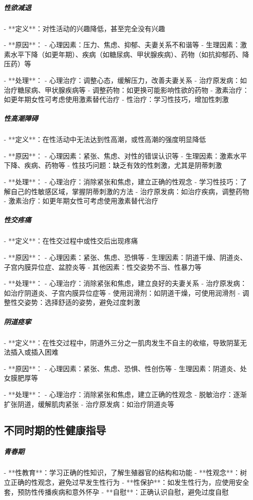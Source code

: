 \begin{enumerate}
\subparagraph{性欲减退}

- **定义**：对性活动的兴趣降低，甚至完全没有兴趣

- **原因**：
  - 心理因素：压力、焦虑、抑郁、夫妻关系不和谐等
  - 生理因素：激素水平下降（如更年期）、疾病（如糖尿病、甲状腺疾病）、药物（如抗抑郁药、降压药）等

- **处理**：
  - 心理治疗：调整心态，缓解压力，改善夫妻关系
  - 治疗原发病：如治疗糖尿病、甲状腺疾病等
  - 调整药物：如更换可能影响性欲的药物
  - 激素治疗：如更年期女性可考虑使用激素替代治疗
  - 性治疗：学习性技巧，增加性刺激

\subparagraph{性高潮障碍}

- **定义**：在性活动中无法达到性高潮，或性高潮的强度明显降低

- **原因**：
  - 心理因素：紧张、焦虑、对性的错误认识等
  - 生理因素：激素水平下降、疾病、药物等
  - 性技巧问题：缺乏有效的性刺激，尤其是阴蒂刺激

- **处理**：
  - 心理治疗：消除紧张和焦虑，建立正确的性观念
  - 学习性技巧：了解自己的性敏感区域，掌握阴蒂刺激的方法
  - 治疗原发病：如治疗疾病，调整药物
  - 激素治疗：如更年期女性可考虑使用激素替代治疗

\subparagraph{性交疼痛}

- **定义**：在性交过程中或性交后出现疼痛

- **原因**：
  - 心理因素：紧张、焦虑、恐惧等
  - 生理因素：阴道干燥、阴道炎、子宫内膜异位症、盆腔炎等
  - 其他因素：性交姿势不当、性暴力等

- **处理**：
  - 心理治疗：消除紧张和焦虑，建立良好的夫妻关系
  - 治疗原发病：如治疗阴道炎、子宫内膜异位症等
  - 使用润滑剂：如阴道干燥，可使用润滑剂
  - 调整性交姿势：选择舒适的姿势，避免过度刺激

\subparagraph{阴道痉挛}

- **定义**：在性交过程中，阴道外三分之一肌肉发生不自主的收缩，导致阴茎无法插入或插入困难

- **原因**：
  - 心理因素：紧张、焦虑、恐惧、性创伤等
  - 生理因素：阴道炎、处女膜肥厚等

- **处理**：
  - 心理治疗：消除紧张和焦虑，建立正确的性观念
  - 脱敏治疗：逐渐扩张阴道，缓解肌肉紧张
  - 治疗原发病：如治疗阴道炎等

\subsection{不同时期的性健康指导}

\subparagraph{青春期}

- **性教育**：学习正确的性知识，了解生殖器官的结构和功能
- **性观念**：树立正确的性观念，避免过早发生性行为
- **性保护**：如发生性行为，应使用安全套，预防性传播疾病和意外怀孕
- **自慰**：正确认识自慰，避免过度自慰


\end{enumerate}
